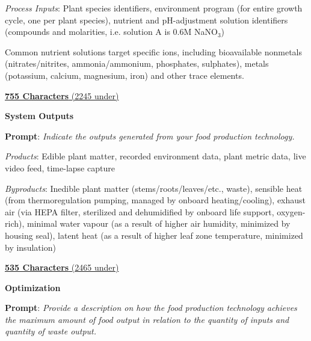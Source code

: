 \documentclass{../tex/report}
\begin{document}
\textit{Process Inputs}: Plant species identifiers, environment program (for entire growth cycle, one per plant species), nutrient and pH-adjustment solution identifiers (compounds and molarities, i.e. solution A is 0.6M NaNO${}_3$)

Common nutrient solutions target specific ions, including bioavailable nonmetals (nitrates/nitrites, ammonia/ammonium, phosphates, sulphates), metals (potassium, calcium, magnesium, iron) and other trace elements.

\uline{\textbf{755 Characters} (2245 under)}

\vspace{0.5cm}

\textbf{System Outputs}
\label{sec:resource-outputs}

\textbf{Prompt}: \textit{Indicate the outputs generated from your food production technology. }


\textit{Products}: Edible plant matter, recorded environment data, plant metric data, live video feed, time-lapse capture

\textit{Byproducts}: Inedible plant matter (stems/roots/leaves/etc., waste), sensible heat (from thermoregulation pumping, managed by onboard heating/cooling), exhaust air (via HEPA filter, sterilized and dehumidified by onboard life support, oxygen-rich), minimal water vapour (as a result of higher air humidity, minimized by housing seal), latent heat (as a result of higher leaf zone temperature, minimized by insulation)

\uline{\textbf{535 Characters} (2465 under)}

\newpage

\textbf{Optimization}
\label{sec:resource-optimization}

\textbf{Prompt}: \textit{Provide a description on how the food production technology achieves the maximum amount of food output in relation to the quantity of inputs and quantity of waste output.} 

\end{document}
